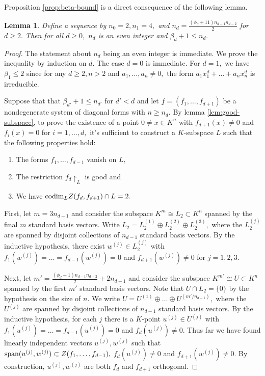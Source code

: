 \documentclass[12pt]{amsart}
\let\ul\underline
\newtheorem{lemma}[theorem]{Lemma}
\theoremstyle{definition}
\renewcommand{\sp}{\textnormal{span}}
\newcommand{\codim}{\textnormal{codim}}
\let\ul\underline
\begin{document}
    Proposition \ref{prop:beta-bound} is a direct consequence of the following lemma.

    \begin{lemma}\label{lem:beta-recursion}
        Define a sequence by $n_0 = 2,n_1 = 4,$ and 
        $n_d = \frac{(\phi_d+11)n_{d-1}n_{d-2}}{2} $ for $d\ge 2.$ Then for all $d\ge 0,$ $n_d$ is an even integer and $\beta_d+1 \le n_d.$
    \end{lemma}

    \begin{proof}
        The statement about $n_d$ being an even integer is immediate. We prove the inequality by induction on $d.$ The case $d=0$ is immediate. For $d=1,$ we have $\beta_1\le 2$ since for any $d\ge 2, n>2$ and $a_1,\ldots,a_n \neq 0,$ the form $a_1x_1^d+\ldots+a_nx_n^d$ is irreducible.
        
        Suppose that that $\beta_{d'}+1 \le n_{d'}$ for $d' < d$ and let $\ul{f} = (f_1,\ldots,f_{d+1})$ be a nondegenerate system of diagonal forms with $n \ge  n_d.$ By lemma \ref{lem:good-subspace}, to prove the existence of a point $0\neq x\in K^n$ with $f_{d+1}(x) \neq 0$ and $f_i(x) = 0$ for $i = 1,\ldots,d,$ it's sufficient to construct a  $K$-subspace $L$ such that the following properties hold:
        \begin{enumerate}
            \item The forms $f_1,\ldots,f_{d-1}$ vanish on $L,$
            \item The restriction $f_d\restriction_L$ is good and
            \item We have $\codim_L Z(f_d,f_{d+1})\cap L = 2.$
        \end{enumerate}

        First, let $m = 3n_{d-1}$ and consider the subspace $K^m\cong L_2\subset K^n$ spanned by the final $m$ standard basis vectors. Write $L_2 = L_2^{(1)}\oplus L_2^{(2)}\oplus L_2^{(3)},$ where the $L_2^{(j)}$ are spanned by disjoint collections of $n_{d-1}$ standard basis vectors. By the inductive hypothesis, there exist $w^{(j)}\in L_2^{(j)} $ with $f_1(w^{(j)}) = \ldots = f_{d-1}(w^{(j)}) = 0$ and $f_{d+1}(w^{(j)}) \neq 0$ for $j=1,2,3.$ 

        Next,  let $m' =\frac{(\phi_d+1)n_{d-1}n_{d-2}}{2} + 2n_{d-1}$ and consider the subspace $K^{m'}\cong U\subset K^n$ spanned by the first $m'$ standard basis vectors. Note that $U\cap L_2 = \{0\}$ by the hypothesis on the size of $n.$ We write $U = U^{(1)}\oplus\ldots\oplus U^{(m'/n_{d-1})},$ where the $U^{(j)}$ are spanned by disjoint collections of $n_{d-1}$ standard basis vectors. By the inductive hypothesis, for each $j$ there is a $K$-point $u^{(j)}\in U^{(j)} $ with $f_1(u^{(j)}) = \ldots = f_{d-1}(u^{(j)}) = 0$ and $f_d(u^{(j)}) \neq 0.$ Thus far we have found linearly independent vectors $u^{(j)},w^{(j)}$ such that $\sp(u^{(j)},w^{(j)}) \subset Z(f_1,\ldots,f_{d-1}),$ $f_d(u^{(j)}) \neq 0$ and $f_{d+1}(w^{(j)})\neq 0.$ By construction, $u^{(j)},w^{(j)}$ are both $f_d$ and $f_{d+1}$ orthogonal.


\end{proof}
\end{document}
